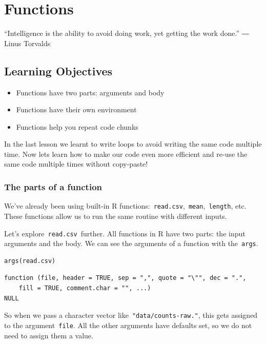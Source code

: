 \documentclass[
]{book}
\providecommand{\tightlist}{%
  \setlength{\itemsep}{0pt}\setlength{\parskip}{0pt}}
\begin{document}
\hypertarget{functions}{%
\chapter{Functions}\label{functions}}

``Intelligence is the ability to avoid doing work, yet getting the work done.''
― Linus Torvalds

\hypertarget{learning-objectives-2}{%
\section{Learning Objectives}\label{learning-objectives-2}}

\begin{itemize}
\tightlist
\item
  Functions have two parts: arguments and body
\item
  Functions have their own environment
\item
  Functions help you repeat code chunks
\end{itemize}

In the last lesson we learnt to write loops to avoid writing the same code multiple time. Now lets learn how to make our code even more efficient and re-use the same code multiple times without copy-paste!

\hypertarget{the-parts-of-a-function}{%
\subsection{The parts of a function}\label{the-parts-of-a-function}}

We've already been using built-in R functions:~\texttt{read.csv},~\texttt{mean},~\texttt{length}, etc. These functions allow us to run the same routine with different inputs.

Let's explore~\texttt{read.csv}~further. All functions in R have two parts: the input arguments and the body. We can see the arguments of a function with the~\texttt{args}.

\begin{verbatim}
args(read.csv)
\end{verbatim}

\begin{verbatim}
function (file, header = TRUE, sep = ",", quote = "\"", dec = ".", 
    fill = TRUE, comment.char = "", ...) 
NULL
\end{verbatim}

So when we pass a character vector like~\texttt{"data/counts-raw."}, this gets assigned to the argument~\texttt{file}. All the other arguments have defaults set, so we do not need to assign them a value.
\end{document}
